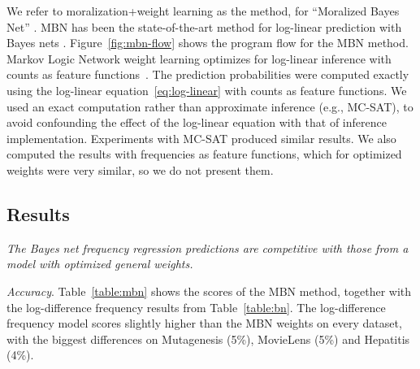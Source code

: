 \documentclass[twoside,11pt]{article}
\newcommand{\point}[1]{\noindent\emph{#1}.}
\newcommand{\keypoint}[1]{{\em #1}}
\begin{document}
We refer to moralization+weight learning as the  method, for ``Moralized Bayes Net''   \cite{Khosravi2010}. 
MBN has been the state-of-the-art method for log-linear prediction with Bayes nets \cite{Schulte2012}. Figure~\ref{fig:mbn-flow} shows the program flow for the MBN method.
Markov Logic Network weight learning optimizes for log-linear inference with counts as feature functions~\cite{Schulte2011}. The prediction probabilities were computed exactly using the log-linear equation~\ref{eq:log-linear} with counts as feature functions. We used an exact computation rather than approximate inference
(e.g., MC-SAT), to avoid confounding the effect of the log-linear equation with that of inference implementation. Experiments with MC-SAT produced similar results. We also computed the results with frequencies as feature functions, which for optimized weights were very similar, so we do not present them. 





\subsection{Results}

\keypoint{The Bayes net frequency regression predictions are competitive with those from a model with optimized general weights.}

\point{Accuracy} Table~\ref{table:mbn} shows the scores of the MBN method, together with the log-difference frequency results from Table~\ref{table:bn}. The log-difference frequency model scores slightly higher than the MBN weights on every dataset, with the biggest differences on Mutagenesis (5\%),  MovieLens (5\%) and Hepatitis (4\%). 
\end{document}
